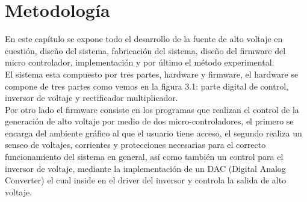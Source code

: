 

\chapter{Metodología}
En este capítulo se expone todo el desarrollo de la fuente de alto voltaje en cuestión, diseño del sistema, fabricación del sistema, diseño del firmware del micro controlador, implementación y por último el método experimental.\\

El sistema esta compuesto por tres partes, hardware y firmware, el hardware se compone de tres partes como vemos en la figura 3.1: parte digital de control, inversor de voltaje y rectificador multiplicador. \\

Por otro lado el firmware consiste en los programas que realizan el control de la generación de alto voltaje por medio de dos micro-controladores, el primero se encarga del ambiente gráfico al que el usuario tiene acceso, el segundo realiza un senseo de voltajes, corrientes y protecciones necesarias para el correcto funcionamiento del sistema en general, así como también un control para el inversor de voltaje, mediante la implementación de un DAC (Digital Analog Converter) el cual inside en el driver del inversor y controla la salida de alto voltaje. 

